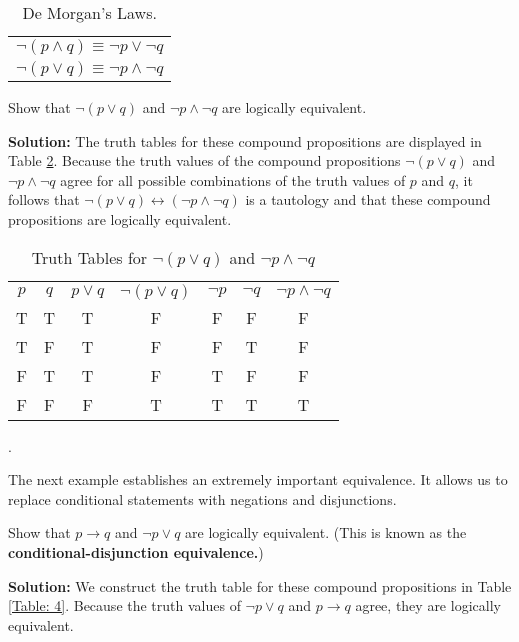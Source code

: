 \documentclass{Axon}
\begin{document}
\begin{table}[h]
    \centering
    \begin{tabular}{c}
        \(\lnot (p \land q) \equiv \lnot p \lor \lnot q\) \\
        \(\lnot (p \lor q) \equiv \lnot p \land \lnot q\)
    \end{tabular}
    \caption{De Morgan's Laws.}
    \label{Table: 2}
\end{table}

\begin{example}\label{Example: 2}
    Show that \(\lnot (p \lor q)\) and \(\lnot p \land \lnot q\) are logically equivalent.

    \noindent
    \textbf{Solution:}
    The truth tables for these compound propositions are displayed in Table \ref{Table: 3}. Because the truth values of the compound propositions \(\lnot (p \lor q)\) and \(\lnot p \land \lnot q\) agree for all possible combinations of the truth values of \(p\) and \(q\), it follows that \(\lnot (p \lor q) \leftrightarrow (\lnot p \land \lnot q)\) is a tautology and that these compound propositions are logically equivalent.
\end{example}

\begin{table}[h]
    \centering
    \begin{tabular}{cc|c|c|c|c|c}
        \(p\) & \(q\) & \(p \lor q\) & \(\lnot (p \lor q)\) & \(\lnot p\) & \(\lnot q\) & \(\lnot p \land \lnot q\) \\
        T     & T     & T            & F                    & F           & F           & F                         \\
        T     & F     & T            & F                    & F           & T           & F                         \\
        F     & T     & T            & F                    & T           & F           & F                         \\
        F     & F     & F            & T                    & T           & T           & T
    \end{tabular}
    \caption{Truth Tables for \(\lnot (p \lor q)\) and \(\lnot p \land \lnot q\)}.
    \label{Table: 3}
\end{table}

The next example establishes an extremely important equivalence. It allows us to replace conditional statements with negations and disjunctions.

\begin{example}
    Show that \(p \to q\) and \(\lnot p \lor q\) are logically equivalent. (This is known as the \textbf{conditional-disjunction equivalence.})

    \noindent
    \textbf{Solution:}
    We construct the truth table for these compound propositions in Table \ref{Table: 4}. Because the truth values of \(\lnot p \lor q\) and \(p \to q\) agree, they are logically equivalent.
\end{example}
\end{document}
